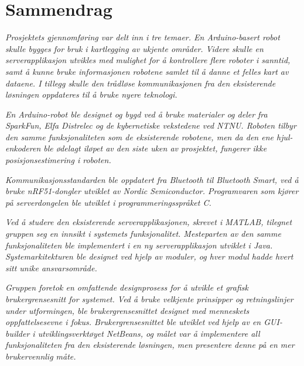 \chapter*{Sammendrag}
\textit{Prosjektets gjennomføring var delt inn i tre temaer. En Arduino-basert robot skulle bygges for bruk i kartlegging av ukjente områder. Videre skulle en serverapplikasjon utvikles med mulighet for å kontrollere flere roboter i sanntid, samt å kunne bruke informasjonen robotene samlet til å danne et felles kart av dataene. I tillegg skulle den trådløse kommunikasjonen fra den eksisterende løsningen oppdateres til å bruke nyere teknologi.}

\textit{En Arduino-robot ble designet og bygd ved å bruke materialer og deler fra SparkFun, Elfa Distrelec og de kybernetiske vekstedene ved NTNU. Roboten tilbyr den samme funksjonaliteten som de eksisterende robotene, men da den ene hjul-enkoderen ble ødelagt iløpet av den siste uken av prosjektet, fungerer ikke posisjonsestimering i roboten.}

\textit{Kommunikasjonsstandarden ble oppdatert fra Bluetooth til Bluetooth Smart, ved å bruke nRF51-dongler utviklet av Nordic Semiconductor. Programvaren som kjører på serverdongelen ble utviklet i programmeringsspråket C.}

\textit{Ved å studere den eksisterende serverapplikasjonen, skrevet i MATLAB, tilegnet gruppen seg en innsikt i systemets funksjonalitet. Mesteparten av den samme funksjonaliteten ble implementert i en ny serverapplikasjon utviklet i Java. Systemarkitekturen ble designet ved hjelp av moduler, og hver modul hadde hvert sitt unike ansvarsområde.}

\textit{Gruppen foretok en omfattende designprosess for å utvikle et grafisk brukergrensesnitt for systemet. Ved å bruke velkjente prinsipper og retningslinjer under utformingen, ble brukergrensesnittet designet med menneskets oppfattelsesevne i fokus. Brukergrensesnittet ble utviklet ved hjelp av en GUI-builder i utviklingsverktøyet NetBeans, og målet var å implementere all funksjonaliteten fra den eksisterende løsningen, men presentere denne på en mer brukervennlig måte.}
